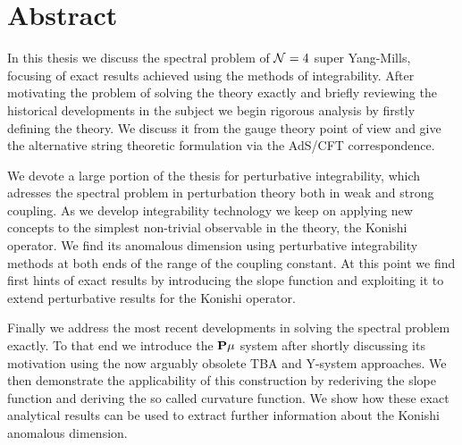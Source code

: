 
\section*{Abstract}

\vspace{30pt}

In this thesis we discuss the spectral problem of $\mathcal{N}=4$ super Yang-Mills, focusing of exact results achieved using the methods of integrability. 
After motivating the problem of solving the theory exactly and briefly reviewing the historical developments in the subject we begin rigorous analysis by firstly defining the theory. 
We discuss it from the gauge theory point of view and give the alternative string theoretic formulation via the AdS/CFT correspondence.

We devote a large portion of the thesis for perturbative integrability, which adresses the spectral problem in perturbation theory both in weak and strong coupling. 
As we develop integrability technology we keep on applying new concepts to the simplest non-trivial observable in the theory, the Konishi operator.
We find its anomalous dimension using perturbative integrability methods at both ends of the range of the coupling constant.
At this point we find first hints of exact results by introducing the slope function and exploiting it to extend perturbative results for the Konishi operator.

Finally we address the most recent developments in solving the spectral problem exactly.
To that end we introduce the ${\bf P}\mu$ system after shortly discussing its motivation using the now arguably obsolete TBA and Y-system approaches. 
We then demonstrate the applicability of this construction by rederiving the slope function and deriving the so called curvature function.
We show how these exact analytical results can be used to extract further information about the Konishi anomalous dimension. 

